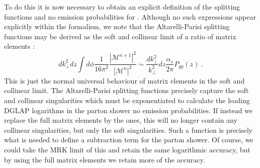 To do this it is now necessary to obtain an explicit definition of the
splitting functions and no emission probabilities for \HEJ.  Although
no such expressions appear explicitly within the \HEJ formalism, we
note that the Altarelli-Parisi splitting functions may be derived as
the soft and collinear limit of a ratio of matrix elements
\cite{Ellis:1991qj}:
\begin{equation}
  d k_\perp^2 dz  \int d\phi \frac{1}{16\pi^2}
  \frac{|\mathcal{M}^{n+1}|^2}{|\mathcal{M}^n|^2}\sim 
  \frac{d k_\perp^2}{k_\perp^2} dz \frac{ \alpha_s}{2\pi} P_{gg}(z)\;. \label{eq:ME2ratio}
\end{equation}
This is just the normal universal behaviour of
  matrix elements in the soft and collinear limit. The 
  Altarelli-Parisi splitting functions precisely capture the 
  soft and collinear singularities which must be exponentiated to
  calculate the leading DGLAP logarithms in the parton shower no emission probabilities.
  If instead we replace the full matrix elements by the \HEJ
  ones, this will no longer contain any collinear singularities, but only
  the soft singularities. Such a function is precisely what is needed
  to define a subtraction term for the parton shower. 
  Of course, we could take the MRK limit of this and retain
  the same logarithmic accuracy, but by using the full matrix elements we
  retain more of the \HEJ accuracy.

